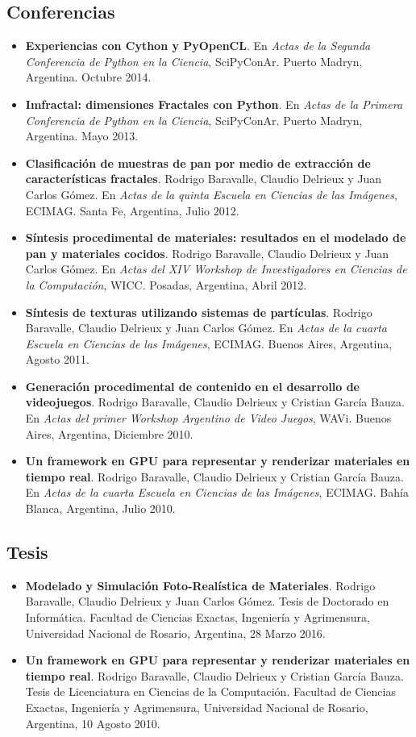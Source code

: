 \documentclass[a4paper,12pt]{article}
\begin{document}
\subsection*{\color{niceblue} Conferencias}
\begin{itemize}
\item {\bf Experiencias con Cython y PyOpenCL}. En {\it Actas de la Segunda Conferencia de Python en la Ciencia}, SciPyConAr. Puerto Madryn, Argentina. Octubre 2014.
\item {\bf Imfractal: dimensiones Fractales con Python}.  En {\it Actas de la Primera Conferencia de Python en la Ciencia}, SciPyConAr. Puerto Madryn, Argentina. Mayo 2013.
\item {\bf Clasificación de muestras de pan por medio de extracción de características fractales}. Rodrigo Baravalle, Claudio Delrieux y Juan Carlos G\'omez. En {\it Actas de la quinta Escuela en Ciencias de las Imágenes}, ECIMAG. Santa Fe, Argentina, Julio 2012.
\item {\bf Síntesis procedimental de materiales: resultados en el modelado de pan y materiales cocidos}. Rodrigo Baravalle, Claudio Delrieux y Juan Carlos G\'omez. En {\it Actas del XIV Workshop de Investigadores en Ciencias de la Computación}, WICC. Posadas, Argentina, Abril 2012.
\item {\bf Síntesis de texturas utilizando sistemas de partículas}. Rodrigo Baravalle, Claudio Delrieux y Juan Carlos G\'omez. En {\it Actas de la cuarta Escuela en Ciencias de las Imágenes}, ECIMAG. Buenos Aires, Argentina, Agosto 2011.
\item {\bf Generación procedimental de contenido en el desarrollo de videojuegos}. Rodrigo Baravalle, Claudio Delrieux y Cristian Garc\'ia Bauza. En {\it Actas del primer Workshop Argentino de Video Juegos}, WAVi. Buenos Aires, Argentina, Diciembre 2010.
\item {\bf Un framework en GPU para representar y renderizar materiales en tiempo real}. Rodrigo Baravalle, Claudio Delrieux y Cristian Garc\'ia Bauza. En {\it Actas de la cuarta Escuela en Ciencias de las Imágenes}, ECIMAG. Bahía Blanca, Argentina, Julio 2010.
\end{itemize}


\subsection*{\color{niceblue} Tesis}
\begin{itemize}
\item {\bf Modelado y Simulación Foto-Realística de Materiales}. Rodrigo Baravalle, Claudio Delrieux y Juan Carlos Gómez. Tesis de Doctorado en Informática. Facultad de Ciencias Exactas, Ingeniería y Agrimensura, Universidad Nacional de Rosario, Argentina, 28 Marzo 2016.
\item {\bf Un framework en GPU para representar y renderizar materiales en tiempo real}. Rodrigo Baravalle, Claudio Delrieux y Cristian Garc\'ia Bauza. Tesis de Licenciatura en Ciencias de la Computación. Facultad de Ciencias Exactas, Ingeniería y Agrimensura, Universidad Nacional de Rosario, Argentina, 10 Agosto 2010.
\end{itemize}
\end{document}
